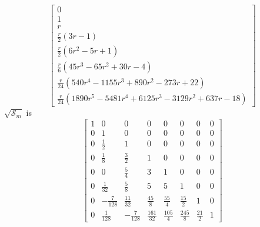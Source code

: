 \begin{displaymath}
\left[\begin{matrix} 0 \\ 1 \\ r \\ \frac{r}{2} \left(3 r - 1\right) \\ \frac{r}{2} \left(6 r^{2} - 5 r + 1\right) \\ \frac{r}{6} \left(45 r^{3} - 65 r^{2} + 30 r - 4\right) \\ \frac{r}{24} \left(540 r^{4} - 1155 r^{3} + 890 r^{2} - 273 r + 22\right) \\ \frac{r}{24} \left(1890 r^{5} - 5481 r^{4} + 6125 r^{3} - 3129 r^{2} + 637 r - 18\right) \end{matrix}\right]
\end{displaymath}
$\sqrt{\mathcal{S}_{m}}$ is
\begin{displaymath}
\left[\begin{matrix}1 & 0 & 0 & 0 & 0 & 0 & 0 & 0\\0 & 1 & 0 & 0 & 0 & 0 & 0 & 0\\0 & \frac{1}{2} & 1 & 0 & 0 & 0 & 0 & 0\\0 & \frac{1}{8} & \frac{3}{2} & 1 & 0 & 0 & 0 & 0\\0 & 0 & \frac{5}{4} & 3 & 1 & 0 & 0 & 0\\0 & \frac{1}{32} & \frac{5}{8} & 5 & 5 & 1 & 0 & 0\\0 & - \frac{7}{128} & \frac{11}{32} & \frac{45}{8} & \frac{55}{4} & \frac{15}{2} & 1 & 0\\0 & \frac{1}{128} & - \frac{7}{128} & \frac{161}{32} & \frac{105}{4} & \frac{245}{8} & \frac{21}{2} & 1\end{matrix}\right]
\end{displaymath}
